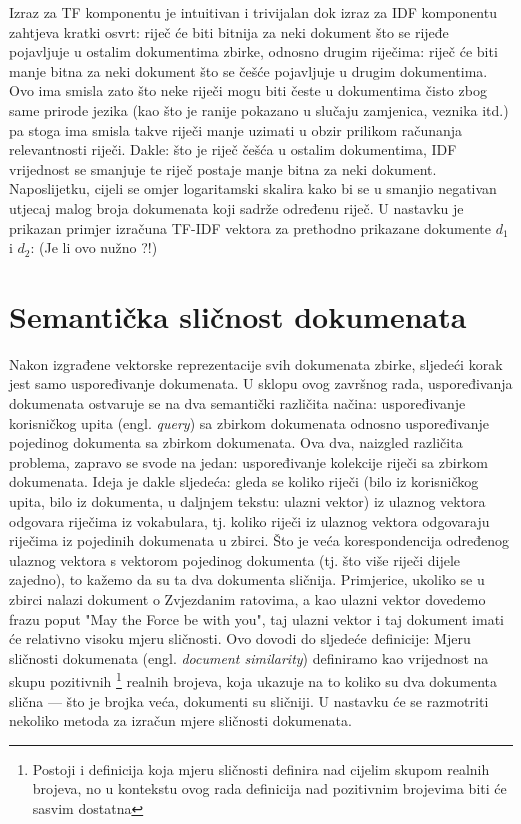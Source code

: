 \documentclass[times, utf8, zavrsni]{fer}
\begin{document}
Izraz za TF komponentu je intuitivan i trivijalan dok izraz za IDF komponentu zahtjeva kratki osvrt: riječ će biti bitnija za neki dokument što se rijeđe pojavljuje u ostalim dokumentima zbirke, odnosno drugim riječima: riječ će biti manje bitna za neki dokument što se češće pojavljuje u drugim dokumentima. Ovo ima smisla zato što neke riječi mogu biti česte u dokumentima čisto zbog same prirode jezika (kao što je ranije pokazano u slučaju zamjenica, veznika itd.) pa stoga ima smisla takve riječi manje uzimati u obzir prilikom računanja relevantnosti riječi. Dakle: što je riječ češća u ostalim dokumentima, IDF vrijednost se smanjuje te riječ postaje manje bitna za neki dokument. Naposlijetku, cijeli se omjer logaritamski skalira kako bi se u smanjio negativan utjecaj malog broja dokumenata koji sadrže određenu riječ. U nastavku je prikazan primjer izračuna TF-IDF vektora za prethodno prikazane dokumente ${d_1}$ i ${d_2}$: (Je li ovo nužno ?!)

\section{Semantička sličnost dokumenata}
\label{subchap:similarity}
Nakon izgrađene vektorske reprezentacije svih dokumenata zbirke, sljedeći korak jest samo uspoređivanje dokumenata. U sklopu ovog završnog rada, uspoređivanja dokumenata ostvaruje se na dva semantički različita načina: uspoređivanje korisničkog upita (engl. \textit{query}) sa zbirkom dokumenata odnosno uspoređivanje pojedinog dokumenta sa zbirkom dokumenata.
Ova dva, naizgled različita problema, zapravo se svode na jedan: uspoređivanje kolekcije riječi sa zbirkom dokumenata. Ideja je dakle sljedeća: gleda se koliko riječi (bilo iz korisničkog upita, bilo iz dokumenta, u daljnjem tekstu: ulazni vektor) iz ulaznog vektora odgovara riječima iz vokabulara, tj. koliko riječi iz ulaznog vektora odgovaraju riječima iz pojedinih dokumenata u zbirci. Što je veća korespondencija određenog ulaznog vektora s vektorom pojedinog dokumenta (tj. što više riječi dijele zajedno), to kažemo da su ta dva dokumenta sličnija. Primjerice, ukoliko se u zbirci nalazi dokument o Zvjezdanim ratovima, a kao ulazni vektor dovedemo frazu poput "May the Force be with you", taj ulazni vektor i taj dokument imati će relativno visoku mjeru sličnosti. Ovo dovodi do sljedeće definicije:
\newline
Mjeru sličnosti dokumenata (engl. \textit{document similarity}) definiramo kao vrijednost na skupu pozitivnih \footnote{Postoji i definicija koja mjeru sličnosti definira nad cijelim skupom realnih brojeva, no u kontekstu ovog rada definicija nad pozitivnim brojevima biti će sasvim dostatna} realnih brojeva, koja ukazuje na to koliko su dva dokumenta slična — što je brojka veća, dokumenti su sličniji.
U nastavku će se razmotriti nekoliko metoda za izračun mjere sličnosti dokumenata.
\end{document}
